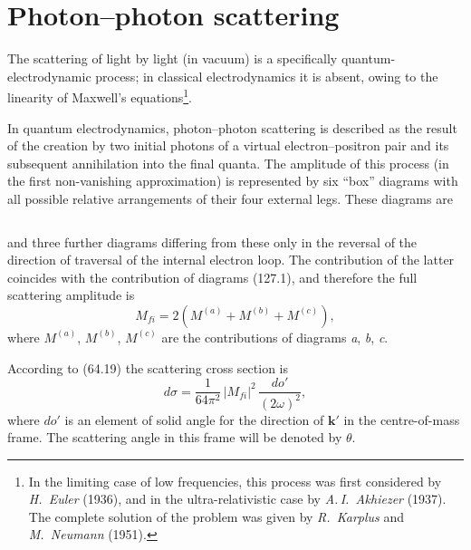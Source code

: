 
\section{Photon--photon scattering}


The scattering of light by light (in vacuum) is a specifically quantum-electrodynamic process; in classical electrodynamics it is absent, owing to the linearity of Maxwell's equations\footnote{In the limiting case of low frequencies, this process was first considered by \emph{H.~Euler} (1936), and in the ultra-relativistic case by \emph{A.\,I.~Akhiezer} (1937). The complete solution of the problem was given by \emph{R.~Karplus} and \emph{M.~Neumann} (1951).}.

In quantum electrodynamics, photon--photon scattering is described as the result of the creation by two initial photons of a virtual electron--positron pair and its subsequent annihilation into the final quanta. The amplitude of this process (in the first non-vanishing approximation) is represented by six ``box'' diagrams with all possible relative arrangements of their four external legs. These diagrams are


\begin{equation}
\label{eq:127.1}
\end{equation}

\noindent and three further diagrams differing from these only in the reversal of the direction of traversal of the internal electron loop. The contribution of the latter coincides with the contribution of diagrams (127.1), and therefore the full scattering amplitude is
\begin{equation}
M_{fi} = 2(M^{(a)} + M^{(b)} + M^{(c)}),
\label{eq:127.2}
\end{equation}
where $M^{(a)}$, $M^{(b)}$, $M^{(c)}$ are the contributions of diagrams \textit{a}, \textit{b}, \textit{c}.

According to (64.19) the scattering cross section is
\begin{equation}
d\sigma = \frac{1}{64\pi^2}\,|M_{fi}|^2\,\frac{do'}{(2\omega)^2},
\label{eq:127.3}
\end{equation}
where $do'$ is an element of solid angle for the direction of $\mathbf{k}'$ in the centre-of-mass frame. The scattering angle in this frame will be denoted by $\theta$.

